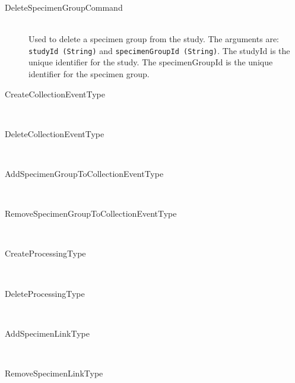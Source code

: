 \begin{description}
    \item[DeleteSpecimenGroupCommand] \hfill \\ Used to delete a specimen group
      from the study. The arguments are: \texttt{studyId (String)} and
      \texttt{specimenGroupId (String)}. The studyId is the unique identifier
      for the study. The specimenGroupId is the unique identifier for the
      specimen group.

    \item[CreateCollectionEventType] \hfill \\

    \item[DeleteCollectionEventType] \hfill \\

    \item[AddSpecimenGroupToCollectionEventType] \hfill \\

    \item[RemoveSpecimenGroupToCollectionEventType] \hfill \\

    \item[CreateProcessingType] \hfill \\

    \item[DeleteProcessingType] \hfill \\

    \item[AddSpecimenLinkType] \hfill \\

    \item[RemoveSpecimenLinkType] \hfill \\

    \item[] \hfill \\

    \item[] \hfill \\

\end{description}

